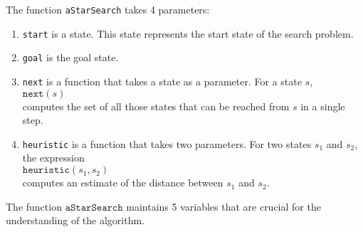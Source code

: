 \noindent
The function \texttt{aStarSearch} takes 4 parameters:
\begin{enumerate}
\item \texttt{start} is a state.  This state represents the start state of the search problem.
\item \texttt{goal} is the goal state.  
\item \texttt{next} is a function that takes a state as a parameter.  For a state $s$,
      \\[0.2cm]
      \hspace*{1.3cm}
      $\mathtt{next}(s)$
      \\[0.2cm]
      computes the set of all those states that can be reached from $s$ in a single step.
\item \texttt{heuristic} is a function that takes two parameters.  
      For two states $s_1$ and $s_2$, the expression
      \\[0.2cm]
      \hspace*{1.3cm}
      $\texttt{heuristic}(s_1, s_2)$ 
      \\[0.2cm]
      computes an estimate of the distance between $s_1$ and $s_2$.
\end{enumerate}
The function $\mathtt{aStarSearch}$ maintains 5 variables that are crucial for the understanding of the
algorithm. 

